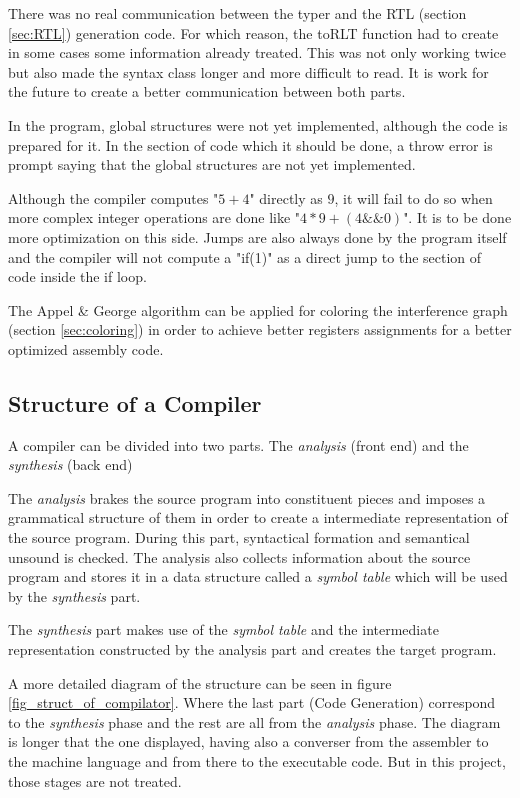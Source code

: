 \documentclass[conference]{IEEEtran}
\theoremstyle{definition}
\begin{document}
There was no real communication between the typer and the RTL (section \ref{sec:RTL}) generation code. For which reason, the toRLT function had to create in some cases some information already treated. This was not only working twice but also made the syntax class longer and more difficult to read. It is work for the future to create a better communication between both parts.

In the program, global structures were not yet implemented, although the code is prepared for it. In the section of code which it should be done, a throw error is prompt saying that the global structures are not yet implemented.

Although the compiler computes "$5 + 4$" directly as $9$, it will fail to do so when more complex integer operations are done like "$4 * 9 + (4 \&\& 0)$". It is to be done more optimization on this side. Jumps are also always done by the program itself and the compiler will not compute a "if(1)" as a direct jump to the section of code inside the if loop.

The Appel \& George algorithm can be applied for coloring the interference graph (section \ref{sec:coloring}) in order to achieve better registers assignments for a better optimized assembly code.

\subsection{Structure of a Compiler}\label{sub_structure_of_a_compiler}

A compiler can be divided into two parts. The \textit{analysis} (front end) and the \textit{synthesis} (back end)

The \textit{analysis} brakes the source program into constituent pieces and imposes a grammatical structure of them in order to create a intermediate representation of the source program. During this part, syntactical formation and semantical unsound is checked. The analysis also collects information about the source program and stores it in a data structure called a \textit{symbol table} which will be used by the \textit{synthesis} part.

The \textit{synthesis} part makes use of the \textit{symbol table} and the intermediate representation constructed by the analysis part and creates the target program.

A more detailed diagram of the structure can be seen in figure \ref{fig_struct_of_compilator}. Where the last part (Code Generation) correspond to the \textit{synthesis} phase and the rest are all from the \textit{analysis} phase. The diagram is longer that the one displayed, having also a converser from the assembler to the machine language and from there to the executable code. But in this project, those stages are not treated.
\end{document}

